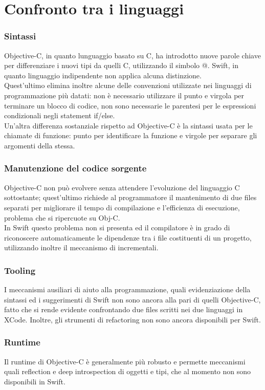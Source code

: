 \chapter{Confronto tra i linguaggi}
\subsection{Sintassi}
Objective-C, in quanto lunguaggio basato su C, ha introdotto nuove parole chiave per differenziare i nuovi tipi da quelli C, utilizzando il simbolo @. Swift, in quanto linguaggio indipendente non applica alcuna distinzione.\\
Quest'ultimo elimina inoltre alcune delle convenzioni utilizzate nei linguaggi di programmazione più datati: non è necessario utilizzare il punto e virgola per terminare un blocco di codice, non sono necessarie le parentesi per le espressioni condizionali negli statement if/else.\\
Un'altra differenza sostanziale rispetto ad Objective-C è la sintassi usata per le chiamate di funzione: punto per identificare la funzione e virgole per separare gli argomenti della stessa.
\subsection{Manutenzione del codice sorgente}
Objective-C non può evolvere senza attendere l'evoluzione del linguaggio C sottostante; quest'ultimo richiede al programmatore il mantenimento di due files separati per migliorare il tempo di compilazione e l'efficienza di esecuzione, problema che si ripercuote su Obj-C.\\
In Swift questo problema non si presenta ed il compilatore è in grado di riconoscere automaticamente le dipendenze tra i file costituenti di un progetto, utilizzando inoltre il meccanismo di  incrementali.
\subsection{Tooling}
I meccanismi ausiliari di aiuto alla programmazione, quali evidenziazione della sintassi ed i suggerimenti di Swift non sono ancora alla pari di quelli Objective-C, fatto che si rende evidente confrontando due files scritti nei due linguaggi in XCode. Inoltre, gli strumenti di refactoring non sono ancora disponibili per Swift.
\subsection{Runtime}
Il runtime di Objective-C è generalmente più robusto e permette meccanismi quali reflection e deep introspection di oggetti e tipi, che al momento non sono disponibili in Swift.

